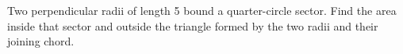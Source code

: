 Two perpendicular radii of length 5 bound a quarter-circle sector. Find the area inside that sector and outside the triangle formed by the two radii and their joining chord.
